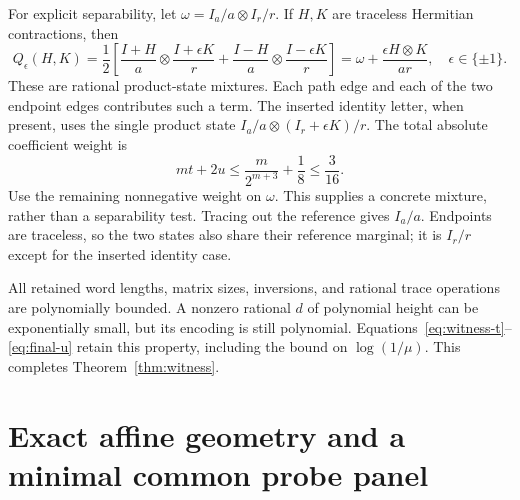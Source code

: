 \documentclass[11pt,a4paper]{article}
\theoremstyle{definition}\newtheorem{definition}[theorem]{Definition}
\begin{document}
For explicit separability, let $\omega=I_a/a\otimes I_r/r$. If $H,K$ are traceless Hermitian contractions, then
\begin{equation}\label{eq:sep}
 Q_{\epsilon}(H,K)=\frac12\left[
 \frac{I+H}{a}\otimes\frac{I+\epsilon K}{r}
 +\frac{I-H}{a}\otimes\frac{I-\epsilon K}{r}\right]
 =\omega+\frac{\epsilon H\otimes K}{ar},\quad\epsilon\in\{\pm1\}.
\end{equation}
These are rational product-state mixtures. Each path edge and each of the two endpoint edges contributes such a term. The inserted identity letter, when present, uses the single product state $I_a/a\otimes(I_r+\epsilon K)/r$. The total absolute coefficient weight is
\[
 mt+2u\le\frac{m}{2^{m+3}}+\frac18\le\frac3{16}.
\]
Use the remaining nonnegative weight on $\omega$. This supplies a concrete mixture, rather than a separability test. Tracing out the reference gives $I_a/a$. Endpoints are traceless, so the two states also share their reference marginal; it is $I_r/r$ except for the inserted identity case.

All retained word lengths, matrix sizes, inversions, and rational trace operations are polynomially bounded. A nonzero rational $d$ of polynomial height can be exponentially small, but its encoding is still polynomial. Equations~\eqref{eq:witness-t}--\eqref{eq:final-u} retain this property, including the bound on $\log(1/\mu)$. This completes Theorem~\ref{thm:witness}.

\section{Exact affine geometry and a minimal common probe panel}\label{sec:panel}
\end{document}
